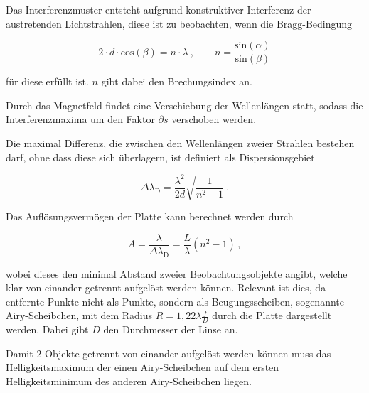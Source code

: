 \noindent
Das Interferenzmuster entsteht aufgrund konstruktiver Interferenz der austretenden Lichtstrahlen, diese ist zu beobachten, wenn die Bragg-Bedingung 

\vspace{-5pt}
\begin{equation}
    2 \cdot d \cdot \text{cos}(\beta) = n \cdot \lambda \: , 
    \qquad n = \frac{\text{sin}(\alpha)}{\text{sin}(\beta)}
\end{equation}

\noindent
für diese erfüllt ist. $n$ gibt dabei den Brechungsindex an.

\noindent
Durch das Magnetfeld findet eine Verschiebung der Wellenlängen statt, sodass die Interferenzmaxima um den Faktor $\partial s$ verschoben werden.

Die maximal Differenz, die zwischen den Wellenlängen zweier Strahlen bestehen darf, ohne dass diese sich überlagern, ist definiert als Dispersionsgebiet

\vspace{-20pt}
\begin{equation}
    \Delta \lambda_\text{D} = \frac{\lambda^2}{2d} \sqrt{\frac{1}{n^2-1}}\, .
    \label{eqn:lam}
\end{equation}

Das Auflösungsvermögen der Platte kann berechnet werden durch 

\vspace{-5pt}
\begin{equation}
    A = \frac{\lambda}{\Delta \lambda_\text{D}} = \frac{L}{\lambda} (n^2 -1) \, ,
    \label{eqn:a}
\end{equation}

\noindent
wobei dieses den minimal Abstand zweier Beobachtungsobjekte angibt, welche klar von einander getrennt aufgelöst werden können. Relevant ist dies, da entfernte Punkte nicht als Punkte,
sondern als Beugungsscheiben, sogenannte Airy-Scheibchen, mit dem Radius $ R = 1,22 \lambda \frac{f}{D}$ durch die Platte dargestellt werden. Dabei gibt $D$ den Durchmesser der 
Linse an. 

\noindent
Damit 2 Objekte getrennt von einander aufgelöst werden können muss das Helligkeitsmaximum der einen Airy-Scheibchen auf dem ersten Helligkeitsminimum des anderen Airy-Scheibchen liegen.


